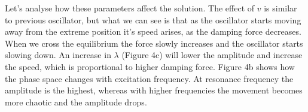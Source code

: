\documentclass[12pt, a4paper]{article}
\begin{document}
Let's analyse how these parameters affect the solution. The effect of $v$ is similar to previous oscillator, but what we can see is that as the oscillator starts moving away from the extreme position it's speed arises, as the damping force decreases. When we cross the equilibrium the force slowly increases and the oscillator starts slowing down. An increase in $\lambda$ (Figure 4c) will lower the amplitude and increase the speed, which is proportional to higher damping force. Figure 4b shows how the phase space changes with excitation frequency. At resonance frequency the amplitude is the highest, whereas with higher frequencies the movement becomes more chaotic and the amplitude drops.
\end{document}

